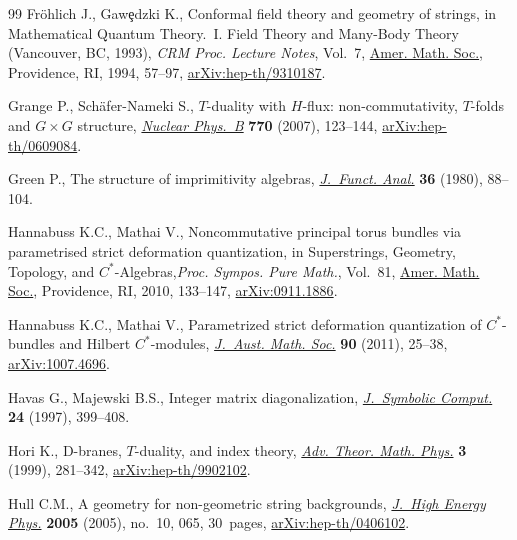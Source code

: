 \documentclass[pdftex]{sigma}
\numberwithin{equation}{section}
\begin{document}
\begin{thebibliography}{99}
Fr\"ohlich J., Gaw\c{e}dzki K., Conformal field theory and geometry of strings,
 in Mathematical Quantum Theory.~{I}. {F}ield Theory and Many-Body Theory
 ({V}ancouver, {BC}, 1993), \textit{CRM Proc. Lecture Notes}, Vol.~7, \href{https://doi.org/10.1090/crmp/007/03}{Amer.
 Math. Soc.}, Providence, RI, 1994, 57--97, \href{https://arxiv.org/abs/hep-th/9310187}{arXiv:hep-th/9310187}.

Grange P., Sch\"afer-Nameki S., {$T$}-duality with {$H$}-flux:
 non-commutativity, {$T$}-folds and {$G\times G$} structure, \href{https://doi.org/10.1016/j.nuclphysb.2007.02.003}{\textit{Nuclear
 Phys.~B}} \textbf{770} (2007), 123--144, \href{https://arxiv.org/abs/hep-th/0609084}{arXiv:hep-th/0609084}.

Green P., The structure of imprimitivity algebras, \href{https://doi.org/10.1016/0022-1236(80)90108-1}{\textit{J.~Funct. Anal.}}
 \textbf{36} (1980), 88--104.

Hannabuss K.C., Mathai V., Noncommutative principal torus bundles via
 parametrised strict deformation quantization, in Superstrings, Geometry,
 Topology, and {$C^\ast$}-Algebras,\textit{Proc. Sympos. Pure Math.},
 Vol.~81, \href{https://doi.org/10.1090/pspum/081/2681761}{Amer. Math. Soc.}, Providence, RI, 2010, 133--147,
 \href{https://arxiv.org/abs/0911.1886}{arXiv:0911.1886}.

Hannabuss K.C., Mathai V., Parametrized strict deformation quantization of
 {$C^\ast$}-bundles and {H}ilbert {$C^\ast$}-modules, \href{https://doi.org/10.1017/S1446788711001170}{\textit{J.~Aust. Math.
 Soc.}} \textbf{90} (2011), 25--38, \href{https://arxiv.org/abs/#2}{arXiv:1007.4696}.

Havas G., Majewski B.S., Integer matrix diagonalization, \href{https://doi.org/10.1006/jsco.1996.0141}{\textit{J.~Symbolic
 Comput.}} \textbf{24} (1997), 399--408.

Hori K., D-branes, {$T$}-duality, and index theory, \href{https://doi.org/10.4310/ATMP.1999.v3.n2.a5}{\textit{Adv. Theor. Math.
 Phys.}} \textbf{3} (1999), 281--342, \href{https://arxiv.org/abs/hep-th/9902102}{arXiv:hep-th/9902102}.

Hull C.M., A geometry for non-geometric string backgrounds, \href{https://doi.org/10.1088/1126-6708/2005/10/065}{\textit{J.~High
 Energy Phys.}} \textbf{2005} (2005), no.~10, 065, 30~pages,
 \href{https://arxiv.org/abs/hep-th/0406102}{arXiv:hep-th/0406102}.


\end{thebibliography}
\end{document}
